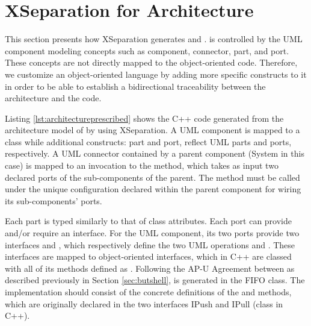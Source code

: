 \section{XSeparation for Architecture}
\label{sec:xseparationarchitecture}
This section presents how XSeparation generates  and .
 is controlled by the UML component modeling concepts such as component, connector, part, and port.
These concepts are not directly mapped to the object-oriented code.
Therefore, we customize an object-oriented language by adding more specific constructs to it in order to be able to establish a bidirectional traceability between the architecture and the code.

Listing \ref{lst:architectureprescribed} shows the C++ code generated from the architecture model of  by using XSeparation.
A UML component is mapped to a class while additional constructs: part and port, reflect UML parts and ports, respectively.
A UML connector contained by a parent component (System in this case) is mapped to an invocation to the  method, which takes as input two declared ports of the sub-components of the parent.
The  method must be called under the unique configuration declared within the parent component for wiring its sub-components' ports.




\begin{minipage}{0.95\columnwidth}
	
\end{minipage}

Each part is typed similarly to that of class attributes.
Each port can provide and/or require an interface.
For the UML  component, its two ports provide two interfaces  and , which respectively define the two UML operations  and .
These interfaces are mapped to object-oriented interfaces, which in C++ are classed with all of its methods defined as .
Following the AP-U Agreement between as described previously in Section \ref{sec:butshell},  is generated in the FIFO class. 
The implementation should consist of the concrete definitions of the  and  methods, which are originally declared in the two interfaces IPush and IPull (class in C++).

